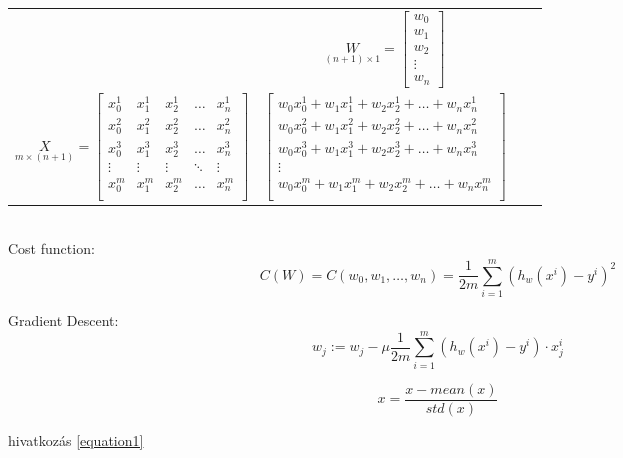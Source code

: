 \documentclass[12pt]{article}
\begin{document}
\begin{tabular}{l*{2}{c}r}
&
$
\underset{(n+1)\times 1}{W}=\left[
\begin{matrix}
	w_{0}\\
	w_{1}\\
	w_{2}\\
	\vdots\\
	w_{n}
\end{matrix} \right]
$
\\
$
\underset{m\times (n+1)}{X}=\left[
\begin{matrix}
	x_{0}^{1} & x_{1}^{1} & x_{2}^{1} & \hdots & x_{n}^{1} \\
	x_{0}^{2} & x_{1}^{2} & x_{2}^{2} & \hdots & x_{n}^{2} \\
	x_{0}^{3} & x_{1}^{3} & x_{2}^{3} & \hdots & x_{n}^{3} \\
	\vdots    & \vdots    & \vdots    & \ddots & \vdots    \\
	x_{0}^{m} & x_{1}^{m} & x_{2}^{m} & \hdots & x_{n}^{m} \\
\end{matrix} \right]
$
&
$
\left[
\begin{matrix}
	w_0x_0^1+w_1x_1^1+w_2x_2^1+\hdots+w_nx_n^1\\
	w_0x_0^2+w_1x_1^2+w_2x_2^2+\hdots+w_nx_n^2\\
	w_0x_0^3+w_1x_1^3+w_2x_2^3+\hdots+w_nx_n^3\\
	\vdots\\
	w_0x_0^m+w_1x_1^m+w_2x_2^m+\hdots+w_nx_n^m\\
\end{matrix} \right]
$
\end{tabular}
\bigskip
\\
Cost function:
\begin{equation}
C(W)=C(w_0,w_1,\hdots,w_n)=\frac{1}{2m}\sum_{i=1}^{m}(h_w(x^i)-y^i)^2
\end{equation}

Gradient Descent:
\begin{equation}
w_j:=w_j-\mu\frac{1}{2m}\sum_{i=1}^{m}(h_w(x^i)-y^i)\cdot x_j^i
\end{equation}

\begin{equation}
\label{equation1}
x=\frac{x-mean(x)}{std(x)}
\end{equation}

hivatkozás \ref{equation1}
\end{document}
